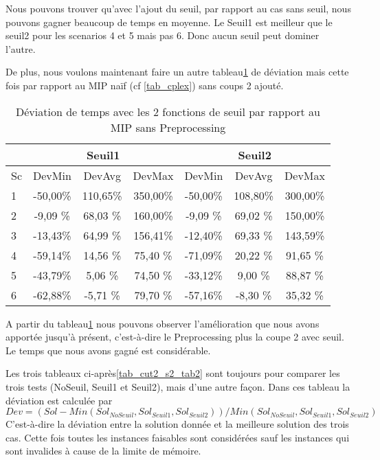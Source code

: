 Nous pouvons trouver qu'avec l'ajout du seuil, par rapport au cas sans seuil, nous pouvons gagner beaucoup de temps en moyenne. Le Seuil1 est meilleur que le seuil2 pour les scenarios 4 et 5 mais pas 6. Donc aucun seuil peut dominer l'autre.

De plus, nous voulons maintenant faire un autre tableau\ref{tab_cut2_seuil_tim_cmp2} de déviation mais cette fois par rapport au MIP naïf (cf \ref{tab_cplex}) sans coups 2 ajouté.
\begin{table}[h]
    \centering
    \begin{tabular}{|l|c|c|c|c|c|c|}
    	\hline
  &\multicolumn{3}{c}{Seuil1}	&\multicolumn{3}{|c|}{Seuil2}\\ \hline
 Sc  & 	DevMin	& DevAvg	& DevMax& 	DevMin	& DevAvg	&DevMax   \\ \hline
 1&	-50,00\%&	110,65\%&	350,00\%&	-50,00\%&	108,80\%&	300,00\%    \\ \hline
2&	-9,09 \%&	68,03 \%&	160,00\%&	-9,09 \%&	69,02 \%&	150,00\%     \\ \hline
3&	-13,43\%&	64,99 \%&	156,41\%&	-12,40\%&	69,33 \%&	143,59\%  \\ \hline
4&	-59,14\%&	14,56 \%&	75,40 \%&	-71,09\%&	20,22 \%&	91,65 \%    \\ \hline
5&	-43,79\%&	5,06	\%&74,50 \%&    -33,12\%&	9,00	\%&88,87  \%     \\ \hline
6&	-62,88\%&	-5,71 \%&	79,70 \%&	-57,16\%&	-8,30 \%&	35,32 \%  \\ \hline
    \end{tabular}
    \caption{Déviation de temps avec les 2 fonctions de seuil par rapport au MIP sans Preprocessing}
    \label{tab_cut2_seuil_tim_cmp2}
\end{table}
\bigskip

A partir du tableau\ref{tab_cut2_seuil_tim_cmp2} nous pouvons observer l'amélioration que nous avons apportée jusqu'à présent, c'est-à-dire le Preprocessing plus la coupe 2 avec seuil. Le temps que nous avons gagné est considérable.

Les trois tableaux ci-après\ref{tab_cut2_s2_tab2} sont toujours pour comparer les trois tests (NoSeuil, Seuil1 et Seuil2), mais d'une autre façon. Dans ces tableau la déviation est calculée par $$Dev = (Sol - Min(Sol_{NoSeuil}, Sol_{Seuil1}, Sol_{Seuil2}))/Min(Sol_{NoSeuil}, Sol_{Seuil1}, Sol_{Seuil2})$$C'est-à-dire la déviation entre la solution donnée et la meilleure solution des trois cas. Cette fois toutes les instances faisables sont considérées sauf les instances qui sont invalides à cause de la limite de mémoire.

